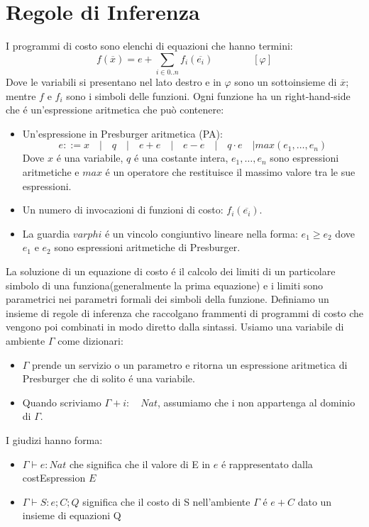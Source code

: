 \documentclass[../../main.tex]{subfiles}
\begin{document}
\section{Regole di Inferenza}
\label{sec:inference_rule}

I programmi di costo sono elenchi di equazioni che hanno termini:
$$f(\overline{x} ) = e + \sum_{i \in 0..n} f_i (\overline{e_i}) \quad \quad \quad \quad[\varphi ]$$
Dove le variabili si presentano nel lato destro e in $\varphi $ sono un sottoinsieme di $\overline{x}$; mentre $f$ e $f_i$ sono i simboli delle funzioni.
Ogni funzione ha un right-hand-side che é un'espressione aritmetica che può contenere:
\begin{itemize}
    \item Un'espressione in Presburger aritmetica (PA):
    $$e ::= x \quad | \quad q \quad | \quad e + e \quad | \quad e - e \quad | \quad q \cdot e \quad |  max(e_1,\dots,e_n)$$
    Dove $x$ é una variabile, $q$ é una costante intera, $e_1,\dots,e_n$ sono espressioni aritmetiche e $max$ é un operatore che restituisce il massimo valore tra le sue espressioni.
    \item Un numero di invocazioni di funzioni di costo: $f_i (\overline{e_i})$.
    \item La guardia $varphi$ é un vincolo congiuntivo lineare nella forma: $e_1 \geq e_2$ dove $e_1$ e $e_2$ sono espressioni aritmetiche di Presburger.
\end{itemize} 

La soluzione di un equazione di costo é il calcolo dei limiti di un particolare simbolo di una funziona(generalmente la prima equazione) e i limiti sono parametrici nei parametri formali dei simboli della funzione.
Definiamo un insieme di regole di inferenza che raccolgano frammenti di programmi di costo che vengono poi combinati in modo diretto dalla sintassi.
Usiamo una variabile di ambiente $ \varGamma $ come dizionari:
\begin{itemize}
    \item $\varGamma$ prende un servizio o un parametro e ritorna un espressione aritmetica di Presburger che di solito é una variabile.
    \item Quando scriviamo $\varGamma + i : \quad Nat $, assumiamo che i non appartenga al dominio di $\varGamma$.
\end{itemize}
I giudizi hanno forma:
\begin{itemize}
    \item $\varGamma \vdash e : Nat$ che significa che il valore di E in $e$ é rappresentato dalla costEspression $E$
    \item $\varGamma \vdash S : e ; C; Q $ significa che il costo di S nell'ambiente $\varGamma$ é $e + C$ dato un insieme di equazioni Q
\end{itemize}
\end{document}
